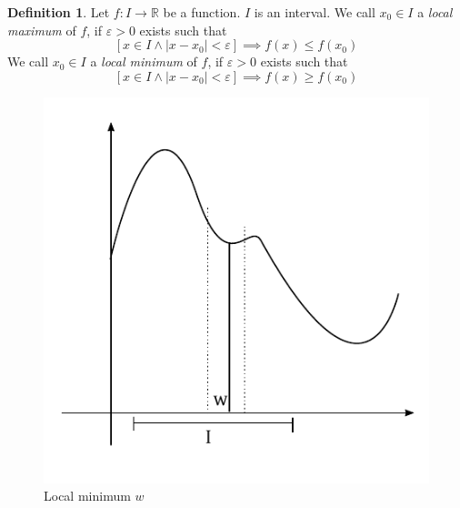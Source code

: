 \documentclass[a4paper,landscape,twocolumn]{article}
\theoremstyle{definition}
\newtheorem{defi}{Definition}
\newcommand\abs[1]{\left|#1\right|}
\begin{document}
\begin{defi}
  Let $f: I \to \mathbb R$ be a function. $I$ is an interval.
  We call $x_0 \in I$ a \emph{local maximum} of $f$, if $\varepsilon > 0$
  exists such that
  \[ [x \in I \land \abs{x - x_0} < \varepsilon] \implies f(x) \leq f(x_0) \]
  We call $x_0 \in I$ a \emph{local minimum} of $f$, if $\varepsilon > 0$
  exists such that
  \[ [x \in I \land \abs{x - x_0} < \varepsilon] \implies f(x) \geq f(x_0) \]
\end{defi}

\begin{figure}[!h]
  \begin{center}
    \includegraphics{img/local_minimum.pdf}
    \caption{Local minimum $w$}
    \label{img:local-minimum}
  \end{center}
\end{figure}

\end{document}
